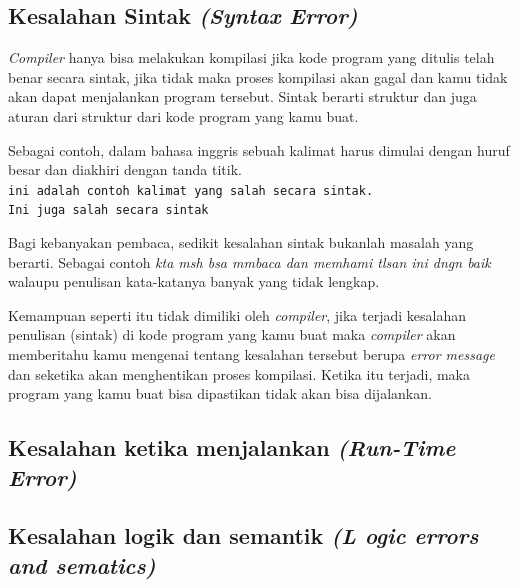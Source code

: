 \subsection{Kesalahan Sintak \textit{(Syntax Error)}}
\textit{Compiler} hanya bisa melakukan kompilasi jika kode program yang ditulis telah benar secara sintak, jika tidak maka proses kompilasi akan gagal dan kamu tidak akan dapat menjalankan program tersebut. Sintak berarti struktur dan juga aturan dari struktur dari kode program yang kamu buat.

Sebagai contoh, dalam bahasa inggris sebuah kalimat harus dimulai dengan huruf besar dan diakhiri dengan tanda titik. \\
\texttt{ini adalah contoh kalimat yang salah secara sintak.} \\
\texttt{Ini juga salah secara sintak}

Bagi kebanyakan pembaca, sedikit kesalahan sintak bukanlah masalah yang berarti. Sebagai contoh\textit{ kta msh bsa mmbaca dan memhami tlsan ini dngn baik} walaupu penulisan kata-katanya banyak yang tidak lengkap.

Kemampuan seperti itu tidak dimiliki oleh \textit{compiler}, jika terjadi kesalahan penulisan (sintak) di kode program yang kamu buat maka \textit{compiler} akan memberitahu kamu mengenai tentang kesalahan tersebut berupa \textit{error message} dan seketika akan menghentikan proses kompilasi. Ketika itu terjadi, maka program yang kamu buat bisa dipastikan tidak akan bisa dijalankan.
\subsection{Kesalahan ketika menjalankan \textit{(Run-Time Error)}}
\subsection{Kesalahan logik dan semantik \textit{(L
		ogic errors and sematics)}}